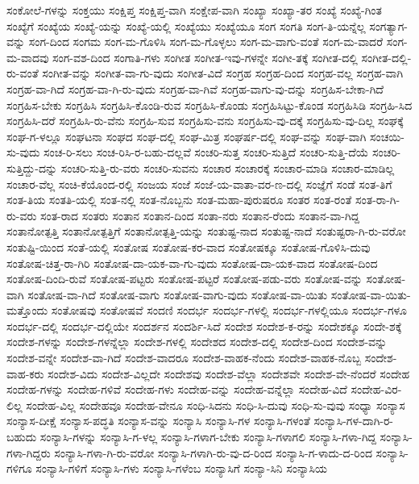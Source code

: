 {ಸಂಕೋಲೆ-ಗಳನ್ನು
ಸಂಕ್ತಯು
ಸಂಕ್ಷಿಪ್ತ
ಸಂಕ್ಷಿಪ್ತ-ವಾಗಿ
ಸಂಕ್ಷೇಪ-ವಾಗಿ
ಸಂಖ್ಯಾ
ಸಂಖ್ಯಾ-ತರ
ಸಂಖ್ಯೆ
ಸಂಖ್ಯೆ-ಗಿಂತ
ಸಂಖ್ಯೆಗೆ
ಸಂಖ್ಯೆಯ
ಸಂಖ್ಯೆ-ಯನ್ನು
ಸಂಖ್ಯೆ-ಯಲ್ಲಿ
ಸಂಖ್ಯೆಯು
ಸಂಖ್ಯೆಯೂ
ಸಂಗ
ಸಂಗತಿ
ಸಂಗ-ತಿ-ಯನ್ನೆಲ್ಲ
ಸಂಗತ್ಯಾಗ-ವನ್ನು
ಸಂಗ-ದಿಂದ
ಸಂಗಮ
ಸಂಗ-ಮ-ಗೊಳಿಸಿ
ಸಂಗ-ಮ-ಗೊಳ್ಳಲು
ಸಂಗ-ಮ-ವಾಗು-ವಂತೆ
ಸಂಗ-ಮ-ವಾದರೆ
ಸಂಗ-ಮ-ವಾದವು
ಸಂಗ-ವಶ-ದಿಂದ
ಸಂಗಾತಿ-ಗಳು
ಸಂಗೀತ
ಸಂಗೀತ-ಇವು-ಗಳನ್ನೇ
ಸಂಗೀ-ತಕ್ಕೆ
ಸಂಗೀತ-ದಲ್ಲಿ
ಸಂಗೀತ-ದಲ್ಲಿ-ರು-ವಂತೆ
ಸಂಗೀತ-ವನ್ನು
ಸಂಗೀತ-ವಾ-ಗು-ವುದು
ಸಂಗೀತ-ವಿದೆ
ಸಂಗ್ರಹ
ಸಂಗ್ರಹ-ದಿಂದ
ಸಂಗ್ರಹ-ವಲ್ಲ
ಸಂಗ್ರಹ-ವಾಗಿ
ಸಂಗ್ರಹ-ವಾ-ಗಿದೆ
ಸಂಗ್ರಹ-ವಾ-ಗಿ-ರು-ವುದು
ಸಂಗ್ರಹ-ವಾ-ಗಿವೆ
ಸಂಗ್ರಹ-ವಾಗು-ವು-ದನ್ನು
ಸಂಗ್ರಹಿಸ-ಬೇಕಾ-ಗಿದೆ
ಸಂಗ್ರಹಿಸ-ಬೇಕು
ಸಂಗ್ರಹಿಸಿ
ಸಂಗ್ರಹಿಸಿ-ಕೊಂಡಿ-ರುವ
ಸಂಗ್ರಹಿಸಿ-ಕೊಂಡು
ಸಂಗ್ರಹಿಸಿಟ್ಟು-ಕೊಂಡ
ಸಂಗ್ರಹಿಸಿಡಿ
ಸಂಗ್ರಹಿ-ಸಿದ
ಸಂಗ್ರಹಿಸಿ-ದರೆ
ಸಂಗ್ರಹಿಸಿ-ರು-ವೆನು
ಸಂಗ್ರಹಿ-ಸುವ
ಸಂಗ್ರಹಿಸು-ವನು
ಸಂಗ್ರಹಿಸು-ವು-ದಕ್ಕೆ
ಸಂಗ್ರಹಿಸು-ವು-ದಿಲ್ಲ
ಸಂಘಕ್ಕೆ
ಸಂಘ-ಗ-ಳಲ್ಲೂ
ಸಂಘಟನಾ
ಸಂಘದ
ಸಂಘ-ದಲ್ಲಿ
ಸಂಘ-ಮಿತ್ರ
ಸಂಘರ್ಷ-ದಲ್ಲಿ
ಸಂಘ-ವನ್ನು
ಸಂಘ-ವಾಗಿ
ಸಂಚಯಿ-ಸು-ವುದು
ಸಂಚ-ರಿ-ಸಲು
ಸಂಚ-ರಿಸಿ-ರ-ಬಹು-ದಲ್ಲವೆ
ಸಂಚರಿ-ಸುತ್ತ
ಸಂಚರಿ-ಸುತ್ತಿದೆ
ಸಂಚರಿ-ಸುತ್ತಿ-ದೆಯೆ
ಸಂಚರಿ-ಸುತ್ತಿದ್ದು-ದನ್ನು
ಸಂಚರಿ-ಸುತ್ತಿ-ರು-ವರು
ಸಂಚರಿ-ಸುವನು
ಸಂಚಾರ
ಸಂಚಾರಕ್ಕೆ
ಸಂಚಾರ-ಮಾಡಿ
ಸಂಚಾರ-ಮಾಡಿಲ್ಲ
ಸಂಚಾರ-ವೆಲ್ಲ
ಸಂಚಿ-ಕೆಯೊಂದ-ರಲ್ಲಿ
ಸಂಜಯ
ಸಂಜೆ
ಸಂಜೆ-ಯ-ವಾತಾ-ವರ-ಣ-ದಲ್ಲಿ
ಸಂಜ್ಞೆಗೆ
ಸಂಡೆ
ಸಂತ-ತಿಗೆ
ಸಂತ-ತಿಯ
ಸಂತತಿ-ಯಲ್ಲಿ
ಸಂತ-ನಲ್ಲಿ
ಸಂತ-ನೊಬ್ಬನು
ಸಂತ-ಮಹಾ-ಪುರುಷರೂ
ಸಂತರ
ಸಂತ-ರಂತೆ
ಸಂತ-ರಾ-ಗಿ-ರು-ವರು
ಸಂತ-ರಾದ
ಸಂತರು
ಸಂತಾನ
ಸಂತಾನ-ದಿಂದ
ಸಂತಾ-ನರು
ಸಂತಾನ-ರೆಂದು
ಸಂತಾನ-ವಾ-ಗಿದ್ದ
ಸಂತಾನೋತ್ಪತ್ತಿ
ಸಂತಾನೋತ್ಪತ್ತಿಗೆ
ಸಂತಾನೋತ್ಪತ್ತಿ-ಯನ್ನು
ಸಂತುಷ್ಟ-ನಾದ
ಸಂತುಷ್ಟ-ನಾದೆ
ಸಂತುಷ್ಟರಾ-ಗಿ-ರು-ವರೋ
ಸಂತುಷ್ಟಿ-ಯಿಂದ
ಸಂತೆ-ಯಲ್ಲಿ
ಸಂತೋಷ
ಸಂತೋಷ-ಕರ-ವಾದ
ಸಂತೋಷಕ್ಕೂ
ಸಂತೋಷ-ಗೊಳಿಸಿ-ದುವು
ಸಂತೋಷ-ಚಿತ್ತ-ರಾ-ಗಿರಿ
ಸಂತೋಷ-ದಾ-ಯಕ-ವಾ-ಗು-ವುದು
ಸಂತೋಷ-ದಾ-ಯಕ-ವಾದ
ಸಂತೋಷ-ದಿಂದ
ಸಂತೋಷ-ದಿಂದಿ-ರುವೆ
ಸಂತೋಷ-ಪಟ್ಟರು
ಸಂತೋಷ-ಪಟ್ಟರೆ
ಸಂತೋಷ-ಪಡು-ವರು
ಸಂತೋಷ-ವನ್ನು
ಸಂತೋಷ-ವಾಗಿ
ಸಂತೋಷ-ವಾ-ಗಿದೆ
ಸಂತೋಷ-ವಾಗು
ಸಂತೋಷ-ವಾಗು-ವುದು
ಸಂತೋಷ-ವಾ-ಯಿತು
ಸಂತೋಷ-ವಾ-ಯಿತು-ಮತ್ತೊಂದು
ಸಂತೋಷವು
ಸಂತೋಷವೆ
ಸಂದಣಿ
ಸಂದರ್ಭ
ಸಂದರ್ಭ-ಗಳಲ್ಲಿ
ಸಂದರ್ಭ-ಗಳಲ್ಲಿಯೂ
ಸಂದರ್ಭ-ಗಳೂ
ಸಂದರ್ಭ-ದಲ್ಲಿ
ಸಂದರ್ಭ-ದಲ್ಲಿಯೇ
ಸಂದರ್ಶನ
ಸಂದರ್ಶಿ-ಸಿದೆ
ಸಂದೇಶ
ಸಂದೇಶ-ಕ-ರನ್ನು
ಸಂದೇಶಕ್ಕೂ
ಸಂದೇ-ಶಕ್ಕೆ
ಸಂದೇಶ-ಗಳನ್ನು
ಸಂದೇಶ-ಗಳನ್ನೆಲ್ಲಾ
ಸಂದೇಶ-ಗಳಲ್ಲಿ
ಸಂದೇಶದ
ಸಂದೇಶ-ದಲ್ಲಿ
ಸಂದೇಶ-ದಿಂದ
ಸಂದೇಶ-ವನ್ನು
ಸಂದೇಶ-ವನ್ನೇ
ಸಂದೇಶ-ವಾ-ಗಿದೆ
ಸಂದೇಶ-ವಾದರೂ
ಸಂದೇಶ-ವಾಹಕ-ನೆಂದು
ಸಂದೇಶ-ವಾಹಕ-ನೊಬ್ಬ
ಸಂದೇಶ-ವಾಹ-ಕರು
ಸಂದೇಶ-ವಿದು
ಸಂದೇಶ-ವಿಲ್ಲದೇ
ಸಂದೇಶವು
ಸಂದೇಶ-ವೆಲ್ಲಾ
ಸಂದೇಶವೇ
ಸಂದೇಶ-ವೇ-ನೆಂದರೆ
ಸಂದೇಹ
ಸಂದೇಹ-ಗಳನ್ನು
ಸಂದೇಹ-ಗಳಿವೆ
ಸಂದೇಹ-ಗಳು
ಸಂದೇಹ-ವನ್ನು
ಸಂದೇಹ-ವನ್ನೆಲ್ಲಾ
ಸಂದೇಹ-ವಿದೆ
ಸಂದೇಹ-ವಿರ-ಲಿಲ್ಲ
ಸಂದೇಹ-ವಿಲ್ಲ
ಸಂದೇಹವೂ
ಸಂದೇಹ-ವೇನೂ
ಸಂಧಿ-ಸಿದನು
ಸಂಧಿ-ಸಿ-ದುವು
ಸಂಧಿ-ಸು-ವುವು
ಸಂಧ್ಯಾ
ಸಂನ್ಯಾಸ
ಸಂನ್ಯಾಸ-ದೀಕ್ಷೆ
ಸಂನ್ಯಾಸ-ಪದ್ಧತಿ
ಸಂನ್ಯಾಸ-ವನ್ನು
ಸಂನ್ಯಾಸಿ
ಸಂನ್ಯಾಸಿ-ಗಳ
ಸಂನ್ಯಾಸಿ-ಗಳಂತೆ
ಸಂನ್ಯಾಸಿ-ಗಳ-ದಾಗಿ-ರ-ಬಹುದು
ಸಂನ್ಯಾಸಿ-ಗಳನ್ನು
ಸಂನ್ಯಾಸಿ-ಗ-ಳಲ್ಲ
ಸಂನ್ಯಾಸಿ-ಗಳಾಗ-ಬೇಕು
ಸಂನ್ಯಾಸಿ-ಗಳಾಗಲಿ
ಸಂನ್ಯಾಸಿ-ಗಳಾ-ಗಿದ್ದ
ಸಂನ್ಯಾಸಿ-ಗಳಾ-ಗಿದ್ದರು
ಸಂನ್ಯಾಸಿ-ಗಳಾ-ಗಿ-ರು-ವರೋ
ಸಂನ್ಯಾಸಿ-ಗಳಾಗಿ-ರು-ವು-ದ-ರಿಂದ
ಸಂನ್ಯಾಸಿ-ಗ-ಳಾದು-ದ-ರಿಂದ
ಸಂನ್ಯಾಸಿ-ಗಳಿಗೂ
ಸಂನ್ಯಾಸಿ-ಗಳಿಗೆ
ಸಂನ್ಯಾಸಿ-ಗಳು
ಸಂನ್ಯಾಸಿ-ಗಳೆಂಬ
ಸಂನ್ಯಾಸಿಗೆ
ಸಂನ್ಯಾ-ಸಿನಿ
ಸಂನ್ಯಾಸಿಯ
}
